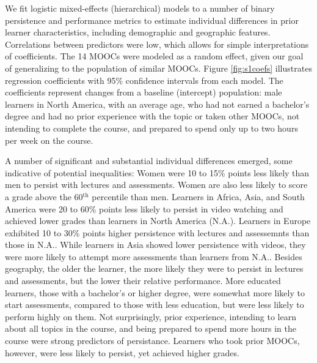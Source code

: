 \documentclass{sigchi}\usepackage[]{graphicx}\usepackage[]{color}
\begin{document}
We fit logistic mixed-effects (hierarchical) models to a number of binary persistence and performance metrics to estimate individual differences in prior learner characteristics, including demographic and geographic features. Correlations between predictors were low, which allows for simple interpretations of coefficients. The 14 MOOCs were modeled as a random effect, given our goal of generalizing to the population of similar MOOCs. Figure \ref{fig:s1coefs} illustrates regression coefficients with 95\% confidence intervals from each model. The coefficients represent changes from a baseline (intercept) population: male learners in North America, with an average age, who had not earned a bachelor's degree and had no prior experience with the topic or taken other MOOCs, not intending to complete the course, and prepared to spend only up to two hours per week on the course.

A number of significant and substantial individual differences emerged, some indicative of potential inequalities: Women were 10 to 15\% points less likely than men to persist with lectures and assessments. Women are also less likely to score a grade above the 60$^\text{th}$ percentile than men. Learners in Africa, Asia, and South America were 20 to 60\% points less likely to persist in video watching and achieved lower grades than learners in North America (N.A.). Learners in Europe exhibited 10 to 30\% points higher persistence with lectures and assessemnts than those in N.A.. While learners in Asia showed lower persistence with videos, they were more likely to attempt more assessments than learners from N.A.. Besides geography, the older the learner, the more likely they were to persist in lectures and assessments, but the lower their relative performance. More educated learners, those with a bachelor's or higher degree, were somewhat more likely to start assessments, compared to those with less education, but were less likely to perform highly on them. Not surprisingly, prior experience, intending to learn about all topics in the course, and being prepared to spend more hours in the course were strong predictors of persistance. Learners who took prior MOOCs, however, were less likely to persist, yet achieved higher grades.
\end{document}
